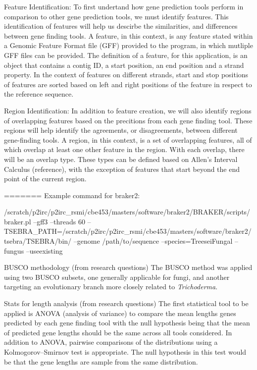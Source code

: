 Feature Identification: To first undertand how gene prediction tools
perform in comparison to other gene prediction tools, we must identify
features. This identification of features will help us descirbe the
similarities, and differences between gene finding tools. A feature,
in this context, is any feature stated within a Genomic Feature Format
file (GFF) provided to the program, in which mutliple GFF files can be
provided. The definition of a feature, for this application, is an
object that contains a contig ID, a start position, an end position
and a strand property. In the context of features on different
strands, start and stop positions of features are sorted based on left
and right positions of the feature in respect to the reference
sequence.

Region Identification: In addition to feature creation, we will also
identify regions of overlapping features based on the precitions from
each gene finding tool. These regions will help identify the
agreements, or disagreements, between different gene-finding tools. A
region, in this context, is a set of overlapping features, all of
which overlap at least one other feature in the region. With each
overlap, there will be an overlap type. These types can be defined
based on Allen's Interval Calculus (reference), with the exception of
features that start beyond the end point of the current region.

=======
Example command for braker2:

/scratch/p2irc/p2irc\_rsmi/cbe453/masters/software/braker2/BRAKER/scripts/braker.pl
--gff3 --threads 60
--TSEBRA\_PATH=/scratch/p2irc/p2irc\_rsmi/cbe453/masters/software/braker2/tsebra/TSEBRA/bin/
--genome /path/to/sequence --species=TreeseiFungal --fungus
--useexisting

BUSCO methodology (from research questions)
The BUSCO method was applied using two BUSCO subsets,
one generally applicable for fungi, and another targeting an
evolutionary branch more closely related to \textit{Trichoderma}.

Stats for length analysis (from research questions)
The first statistical tool to be applied is ANOVA (analysis of
variance) to compare the mean lengths genes predicted by each gene
finding tool with the null hypothesis being that the mean of predicted
gene lengths should be the same across all tools considered. In
addition to ANOVA, pairwise comparisons of the distributions using a
Kolmogorov–Smirnov test is appropriate. The null hypothesis in this
test would be that the gene lengths are sample from the same
distribution.


